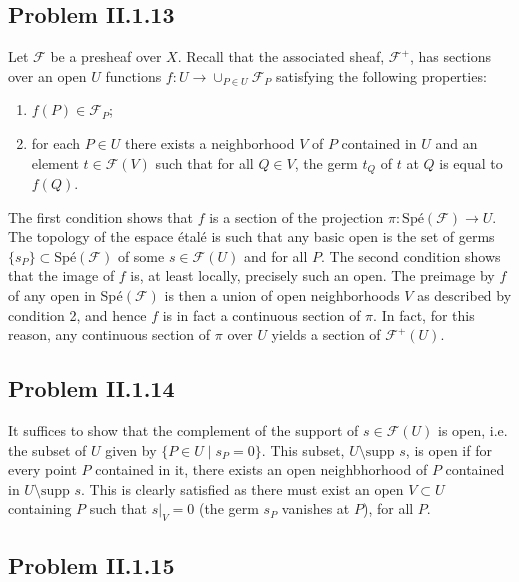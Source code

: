 \documentclass{mathnotes}
\begin{document}
\subsection*{Problem II.1.13}
Let $\mathcal{F}$ be a presheaf over $X$. Recall that the associated sheaf, $\mathcal{F}^+$, has sections over an open $U$
functions $f:U\to\cup_{P\in U}\mathcal{F}_P$ satisfying the following properties:
\begin{enumerate}
    \item $f(P)\in\mathcal{F}_P$;
    \item for each $P\in U$ there exists a neighborhood $V$ of $P$ contained in $U$ and an element
        $t\in\mathcal{F}(V)$ such that for all $Q\in V$, the germ $t_Q$ of $t$ at $Q$ is equal to $f(Q)$.
\end{enumerate}
The first condition shows that $f$ is a section of the projection $\pi:\text{Sp\'e}(\mathcal{F})\to U$. The topology
of the espace \'etal\'e is such that any basic open is the set of germs $\{s_P\}\subset\text{Sp\'e}(\mathcal{F})$ of some $s\in\mathcal{F}(U)$
and for all $P$. The second condition shows that the image of $f$ is, at least locally, precisely such an open.
The preimage by $f$ of any open in Sp\'e$(\mathcal{F})$ is then a union of open neighborhoods $V$ as described by condition 2,
and hence $f$ is in fact a continuous section of $\pi$. In fact, for this reason, any continuous section of $\pi$ 
over $U$ yields a section of $\mathcal{F}^+(U)$.


\subsection*{Problem II.1.14}
It suffices to show that the complement of the support of $s\in\mathcal{F}(U)$ is open, i.e. the
subset of $U$ given by $\{P\in U \mid s_P=0\}$. This subset, $U\setminus\text{supp }s$, is open if for every point $P$ contained in it,
there exists an open neighbhorhood of $P$ contained in $U\setminus\text{supp }s$. This is clearly satisfied as there must exist an
open $V\subset U$ containing $P$ such that $s|_V=0$ (the germ $s_P$ vanishes at $P$), for all $P$.

\subsection*{Problem II.1.15}
\end{document}

